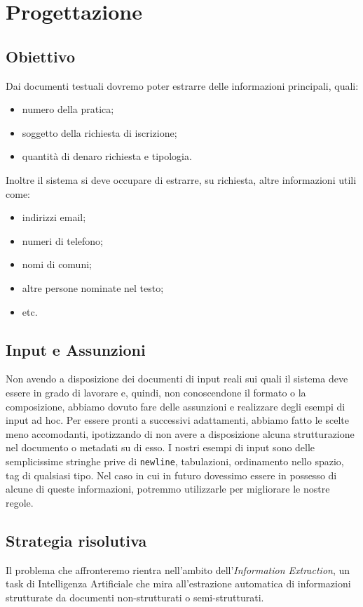 \section{Progettazione}

\subsection{Obiettivo}
Dai documenti testuali dovremo poter estrarre delle informazioni principali, quali:
\begin{itemize}
\item numero della pratica; %
\item soggetto della richiesta di iscrizione;
\item quantità di denaro richiesta e tipologia.
\end{itemize}

Inoltre il sistema si deve occupare di estrarre, su richiesta, altre informazioni utili come:
\begin{itemize}
\item indirizzi email;
\item numeri di telefono;
\item nomi di comuni;
\item altre persone nominate nel testo;
\item etc.
\end{itemize}


\subsection{Input e Assunzioni}
Non avendo a disposizione dei documenti di input reali sui quali il sistema deve essere in grado di lavorare e, quindi, non conoscendone il formato o la composizione, abbiamo dovuto fare delle assunzioni e realizzare degli esempi di input ad hoc.
Per essere pronti a successivi adattamenti, abbiamo fatto le scelte meno accomodanti, ipotizzando di non avere a disposizione alcuna strutturazione nel documento o metadati su di esso.
I nostri esempi di input sono delle semplicissime stringhe prive di \verb+newline+, tabulazioni, ordinamento nello spazio, tag di qualsiasi tipo.
Nel caso in cui in futuro dovessimo essere in possesso di alcune di queste informazioni, potremmo utilizzarle per migliorare le nostre regole.


\subsection{Strategia risolutiva}
Il problema che affronteremo rientra nell'ambito dell'\emph{Information Extraction}, un task di Intelligenza Artificiale che mira all'estrazione automatica di informazioni strutturate da documenti non-strutturati o semi-strutturati.

